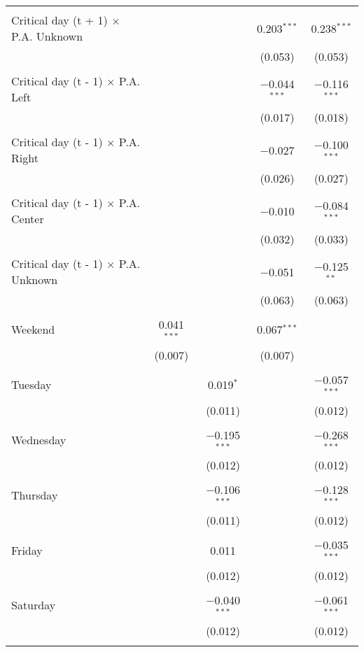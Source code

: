 \documentclass[
]{article}
\begin{document}
\begin{table}[!htbp]
{\begin{tabular}{@{\extracolsep{5pt}}lcccc}
  & & & & \\ 
 Critical day (t + 1) $\times$ P.A. Unknown &  &  & 0.203$^{***}$ & 0.238$^{***}$ \\ 
  &  &  & (0.053) & (0.053) \\ 
  & & & & \\ 
 Critical day (t - 1) $\times$ P.A. Left &  &  & $-$0.044$^{***}$ & $-$0.116$^{***}$ \\ 
  &  &  & (0.017) & (0.018) \\ 
  & & & & \\ 
 Critical day (t - 1) $\times$ P.A. Right &  &  & $-$0.027 & $-$0.100$^{***}$ \\ 
  &  &  & (0.026) & (0.027) \\ 
  & & & & \\ 
 Critical day (t - 1) $\times$ P.A. Center &  &  & $-$0.010 & $-$0.084$^{***}$ \\ 
  &  &  & (0.032) & (0.033) \\ 
  & & & & \\ 
 Critical day (t - 1) $\times$ P.A. Unknown &  &  & $-$0.051 & $-$0.125$^{**}$ \\ 
  &  &  & (0.063) & (0.063) \\ 
  & & & & \\ 
 Weekend & 0.041$^{***}$ &  & 0.067$^{***}$ &  \\ 
  & (0.007) &  & (0.007) &  \\ 
  & & & & \\ 
 Tuesday &  & 0.019$^{*}$ &  & $-$0.057$^{***}$ \\ 
  &  & (0.011) &  & (0.012) \\ 
  & & & & \\ 
 Wednesday &  & $-$0.195$^{***}$ &  & $-$0.268$^{***}$ \\ 
  &  & (0.012) &  & (0.012) \\ 
  & & & & \\ 
 Thursday &  & $-$0.106$^{***}$ &  & $-$0.128$^{***}$ \\ 
  &  & (0.011) &  & (0.012) \\ 
  & & & & \\ 
 Friday &  & 0.011 &  & $-$0.035$^{***}$ \\ 
  &  & (0.012) &  & (0.012) \\ 
  & & & & \\ 
 Saturday &  & $-$0.040$^{***}$ &  & $-$0.061$^{***}$ \\ 
  &  & (0.012) &  & (0.012) \\ 
  & & & & \\ 

\end{tabular}}
\end{table}
\end{document}
